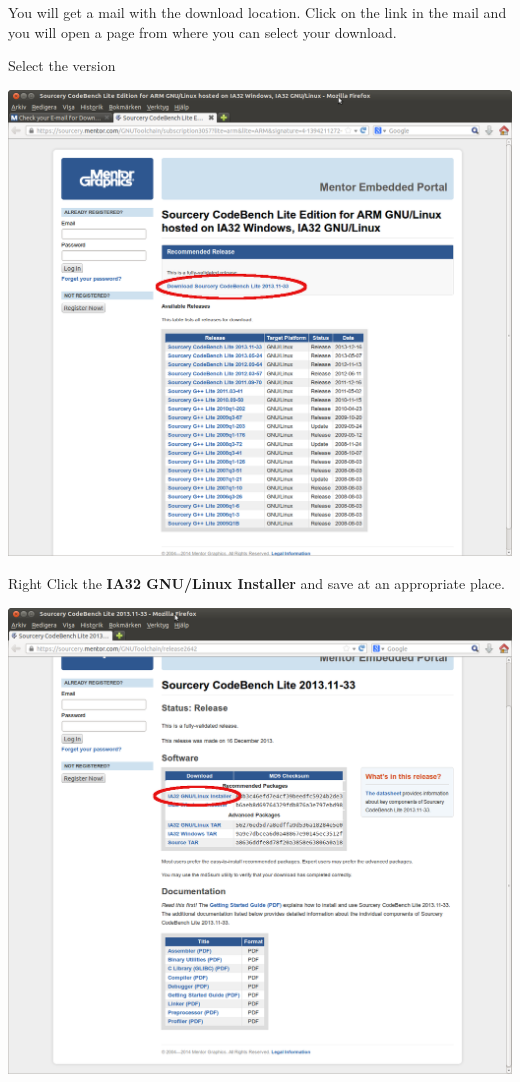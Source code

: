 You will get a mail with the download location.
Click on the link in the mail and you will open a page from where
you can select your download.
\clearpage

Select the \codesourcery version


\begin{center}
  \includegraphics[width=\textwidth]{labs/codesourcery/Codebench_Lite_2013_11.png}
\end{center}
\clearpage

Right Click the {\bf IA32 GNU/Linux Installer} and save at an appropriate place.

\begin{center}
  \includegraphics[width=\textwidth]{labs/codesourcery/Codebench_Lite_2013_11_Gnu-Linux.png}
\end{center}

